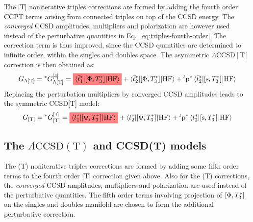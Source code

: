 
The [T] noniterative triples corrections are formed by adding the fourth
order \acrshort{CC}\acrshort{PT} terms arising from connected triples on top of
the \acrshort{CCSD} energy. The \emph{converged} \acrshort{CCSD} amplitudes,
multipliers and polarization are however used instead of the
perturbative quantities in Eq.~\eqref{eq:triples-fourth-order}.
The correction term is thus improved, since the \acrshort{CCSD} quantities
are determined to infinite order, within the singles and doubles space.
The asymmetric $\Lambda\text{CCSD}[\text{T}]$ correction is then
obtained as:
\begin{equation}\label{eq:4-lambda-bracket-t}
  G_{\Lambda[\text{T}]} =
  {}^*G_{\Lambda[\text{T}]}^{[4]} =
  \highlight{red}{\braket{\tbar{1}^{*} | \commutator{\Phi}{T_3^{*}} | \mathrm{HF}}}
  + \braket{\tbar{2}^{*}| \commutator{\Phi}{T_3^{*}} | \mathrm{HF}}
  + {}^t\p^{*}\braket{\tbar{2}^{*} | \commutator{\s}{T_3^{*}} | \mathrm{HF}}
\end{equation}
Replacing the perturbation multipliers by converged \acrshort{CCSD}
amplitudes leads to the symmetric CCSD[T] model:
\begin{equation}\label{eq:4-bracket-t}
  G_{[\text{T}]} =
  {}^*G_{[\text{T}]}^{[4]} =
  \highlight{red}{\braket{\tamp{1}^{*} | \commutator{\Phi}{T_3^{*}} | \mathrm{HF}}}
  + \braket{\tamp{2}^{*}| \commutator{\Phi}{T_3^{*}} | \mathrm{HF}}
  + {}^t\p^{*}\braket{\tamp{2}^{*} | \commutator{\s}{T_3^{*}} | \mathrm{HF}}
\end{equation}

\subsection{The
\texorpdfstring{$\Lambda\text{CCSD}(\text{T})$}{CCSD(aT)} and CCSD(T) models}


The (T) noniterative triples corrections are formed by adding some fifth
order terms to the fourth order [T] correction given above.
Also for the (T) corrections, the \emph{converged} \acrshort{CCSD} amplitudes, multipliers and polarization
are used instead of the perturbative quantities.
The fifth order terms involving projection of
$[ \Phi, T_3^{*} ]^{}$ on the singles and doubles manifold are
chosen to form the additional perturbative correction.

